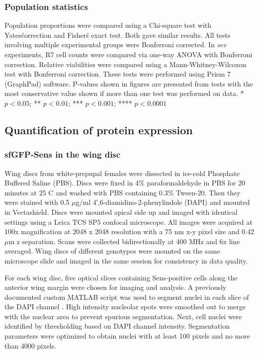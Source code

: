 \subsubsection{Population statistics}

Population proportions were compared using a Chi-square test with Yates\' correction and Fisher\'s exact test. Both gave similar results. All tests involving multiple experimental groups were Bonferroni corrected. In \textit{sev} experiments, R7 cell counts were compared via one-way ANOVA with Bonferroni correction. Relative viabilities were compared using a Mann-Whitney-Wilcoxon test with Bonferroni correction. These tests were performed using Prism 7 (GraphPad) software. P-values shown in figures are presented from tests with the most conservative value shown if more than one test was performed on data. * $p<0.05$; ** $p<0.01$; *** $p<0.001$; **** $p<0.0001$

\subsection{Quantification of protein expression}
\label{appendix:supp:metabolism:exp:measurements}

\subsubsection{sfGFP-Sens in the wing disc}
\label{appendix:supp:metabolism:exp:sens}

Wing discs from white-prepupal females were dissected in ice-cold Phosphate Buffered Saline (PBS). Discs were fixed in 4\% paraformaldehyde in PBS for 20 minutes at 25 \textdegree{}C and washed with PBS containing 0.3\% Tween-20. Then they were stained with 0.5 $\mu$g/ml 4′,6-diamidino-2-phenylindole (DAPI) and mounted in Vectashield. Discs were mounted apical side up and imaged with identical settings using a Leica TCS SP5 confocal microscope. All images were acquired at 100x magnification at 2048 x 2048 resolution with a 75 nm x-y pixel size and 0.42 $\mu$m z separation. Scans were collected bidirectionally at 400 MHz and 6x line averaged. Wing discs of different genotypes were mounted on the same microscope slide and imaged in the same session for consistency in data quality.

For each wing disc, five optical slices containing Sens-positive cells along the anterior wing margin were chosen for imaging and analysis. A previously documented custom MATLAB script was used to segment nuclei in each slice of the DAPI channel \cite{Pelaez2015a}. High intensity nucleolar spots were smoothed out to merge with the nuclear area to prevent spurious segmentation. Next, cell nuclei were identified by thresholding based on DAPI channel intensity. Segmentation parameters were optimized to obtain nuclei with at least 100 pixels and no more than 4000 pixels.

